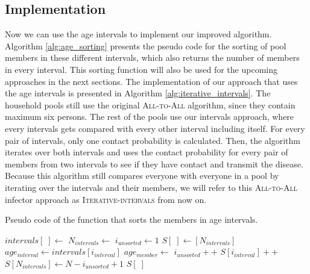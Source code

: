 \subsection{Implementation}
\label{subsec:implementation_iterative_intervals}
Now we can use the age intervals to implement our improved algorithm. Algorithm \ref{alg:age_sorting} presents the pseudo code for the sorting of pool members in these different intervals, which also returns the number of members in every interval. This sorting function will also be used for the upcoming approaches in the next sections. The implementation of our approach that uses the age intervals is presented in Algorithm \ref{alg:iterative_intervals}. The household pools still use the original \textsc{All-to-All} algorithm, since they contain maximum six persons. The rest of the pools use our intervals approach, where every intervals gets compared with every other interval including itself. For every pair of intervals, only one contact probability is calculated. Then, the algorithm iterates over both intervals and uses the contact probability for every pair of members from two intervals to see if they have contact and transmit the disease. Because this algorithm still compares everyone with everyone in a pool by iterating over the intervals and their members, we will refer to this \textsc{All-to-All} infector approach as \textsc{Iterative-intervals} from now on.

\begin{algorithm}
\caption{Pseudo code of the function that sorts the members in age intervals.}
\label{alg:age_sorting}
\begin{algorithmic}[1]
     \;
     
    \Statex
    \State $intervals[\;] \gets$ 
    \State $N_{intervals} \gets$  
    \State $i_{unsorted} \gets 1$
    \State $S[\;] \gets [N_{intervals}]$
    \Statex
        \State $age_{interval} \gets intervals[i_{interval}]$ 
            \State $age_{member} \gets$ 
                    \State {}
                \EndIf
                \State $i_{unsorted}++$
                \State $S[i_{interval}]++$
            \EndIf
        \EndFor
    \EndFor
    \State $S[N_{intervals}] \gets N - i_{unsorted} + 1$ 
    \Statex
    \State \Return $S[\;]$
\end{algorithmic}
\end{algorithm}

